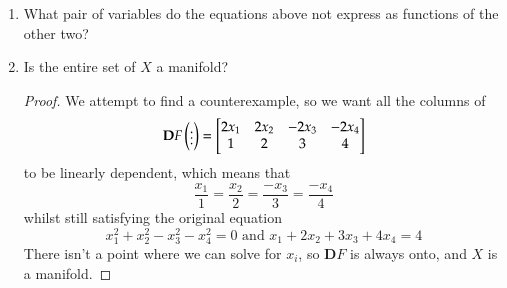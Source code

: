 \begin{enumerate}
\item What pair of variables do the equations above not express as functions of the other two? 

\item Is the entire set of $X$ a manifold? 

\begin{proof}
We attempt to find a counterexample, so we want all the columns of 
\[\textbf{D}F\begin{pmatrix} \vdots \end{pmatrix} = \begin{bmatrix} 2x_1 & 2x_2 & -2x_3 & -2x_4 \\ 1 & 2 & 3 & 4 \end{bmatrix}\]
to be linearly dependent, which means that
\[\frac{x_1}{1}=\frac{x_2}{2}=\frac{-x_3}{3} = \frac{-x_4}{4}\]
whilst still satisfying the original equation
\[x_1^2+x_2^2-x_3^2-x_4^2=0\text{ and }x_1+2x_2+3x_3+4x_4=4\]
There isn't a point where we can solve for $x_i$, so $\bm{D}F$ is always onto, and $X$ is a manifold. 
\end{proof}

\end{enumerate}